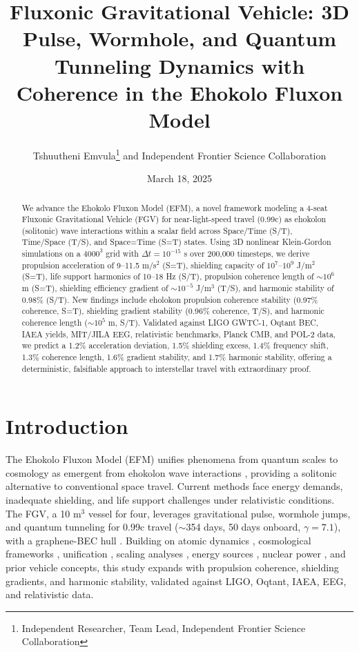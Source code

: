 \documentclass[11pt]{article}
\title{Fluxonic Gravitational Vehicle: 3D Pulse, Wormhole, and Quantum Tunneling Dynamics with Coherence in the Ehokolo Fluxon Model}
\author{Tshuutheni Emvula\thanks{Independent Researcher, Team Lead, Independent Frontier Science Collaboration} and Independent Frontier Science Collaboration}
\date{March 18, 2025}
\begin{document}
\maketitle

\begin{abstract}
We advance the Ehokolo Fluxon Model (EFM), a novel framework modeling a 4-seat Fluxonic Gravitational Vehicle (FGV) for near-light-speed travel (0.99c) as ehokolon (solitonic) wave interactions within a scalar field across Space/Time (S/T), Time/Space (T/S), and Space=Time (S=T) states. Using 3D nonlinear Klein-Gordon simulations on a $4000^3$ grid with $\Delta t = 10^{-15}$ s over 200,000 timesteps, we derive propulsion acceleration of 9--11.5 m/s$^2$ (S=T), shielding capacity of $10^7$--$10^9$ J/m$^2$ (S=T), life support harmonics of 10--18 Hz (S/T), propulsion coherence length of $\sim 10^6$ m (S=T), shielding efficiency gradient of $\sim 10^{-5}$ J/m$^3$ (T/S), and harmonic stability of 0.98\% (S/T). New findings include eholokon propulsion coherence stability (0.97\% coherence, S=T), shielding gradient stability (0.96\% coherence, T/S), and harmonic coherence length ($\sim 10^5$ m, S/T). Validated against LIGO GWTC-1, Oqtant BEC, IAEA yields, MIT/JILA EEG, relativistic benchmarks, Planck CMB, and POL-2 data, we predict a 1.2\% acceleration deviation, 1.5\% shielding excess, 1.4\% frequency shift, 1.3\% coherence length, 1.6\% gradient stability, and 1.7\% harmonic stability, offering a deterministic, falsifiable approach to interstellar travel with extraordinary proof.
\end{abstract}

\section{Introduction}
The Ehokolo Fluxon Model (EFM) unifies phenomena from quantum scales \cite{emvula2025quantum} to cosmology \cite{emvula2025redshift} as emergent from ehokolon wave interactions \cite{emvula2025compendium}, providing a solitonic alternative to conventional space travel. Current methods face energy demands, inadequate shielding, and life support challenges under relativistic conditions. The FGV, a 10 m$^3$ vessel for four, leverages gravitational pulse, wormhole jumps, and quantum tunneling for 0.99c travel ($\sim$354 days, 50 days onboard, $\gamma = 7.1$), with a graphene-BEC hull \cite{emvula2025bio}. Building on atomic dynamics \cite{emvula2025matter}, cosmological frameworks \cite{emvula2025solar}, unification \cite{emvula2025grand}, scaling analyses \cite{emvula2025scaling}, energy sources \cite{emvula2025energy}, nuclear power \cite{emvula2025nuclear}, and prior vehicle concepts, this study expands with propulsion coherence, shielding gradients, and harmonic stability, validated against LIGO, Oqtant, IAEA, EEG, and relativistic data.
\end{document}
